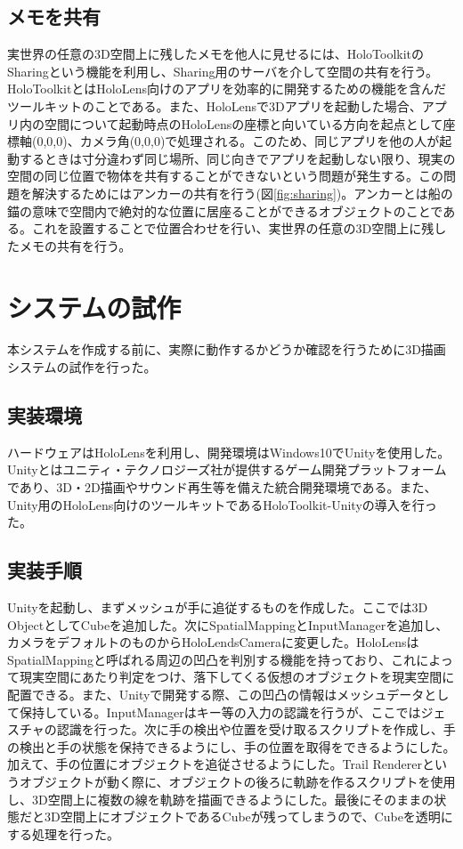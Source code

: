 \documentclass{hissymp}
\begin{document}
\subsection{メモを共有}
実世界の任意の3D空間上に残したメモを他人に見せるには、HoloToolkit\cite{tex7}のSharing\cite{tex8}という機能を利用し、Sharing用のサーバを介して空間の共有を行う。HoloToolkitとはHoloLens向けのアプリを効率的に開発するための機能を含んだツールキットのことである。また、HoloLensで3Dアプリを起動した場合、アプリ内の空間について起動時点のHoloLensの座標と向いている方向を起点として座標軸(0,0,0)、カメラ角(0,0,0)で処理される。このため、同じアプリを他の人が起動するときは寸分違わず同じ場所、同じ向きでアプリを起動しない限り、現実の空間の同じ位置で物体を共有することができないという問題が発生する。この問題を解決するためにはアンカーの共有を行う(図\ref{fig:sharing})。アンカーとは船の錨の意味で空間内で絶対的な位置に居座ることができるオブジェクトのことである。これを設置することで位置合わせを行い、実世界の任意の3D空間上に残したメモの共有を行う。

\section{システムの試作}
本システムを作成する前に、実際に動作するかどうか確認を行うために3D描画システムの試作を行った。

\subsection{実装環境}
ハードウェアはHoloLensを利用し、開発環境はWindows10でUnity\cite{tex9}を使用した。Unityとはユニティ・テクノロジーズ社が提供するゲーム開発プラットフォームであり、3D・2D描画やサウンド再生等を備えた統合開発環境である。また、Unity用のHoloLens向けのツールキットであるHoloToolkit-Unityの導入を行った。

\subsection{実装手順}
Unityを起動し、まずメッシュが手に追従するものを作成した。ここでは3D ObjectとしてCubeを追加した。次にSpatialMappingとInputManagerを追加し、カメラをデフォルトのものからHoloLendsCameraに変更した。HoloLensはSpatialMappingと呼ばれる周辺の凹凸を判別する機能を持っており、これによって現実空間にあたり判定をつけ、落下してくる仮想のオブジェクトを現実空間に配置できる。また、Unityで開発する際、この凹凸の情報はメッシュデータとして保持している。InputManagerはキー等の入力の認識を行うが、ここではジェスチャの認識を行った。次に手の検出や位置を受け取るスクリプトを作成し、手の検出と手の状態を保持できるようにし、手の位置を取得をできるようにした。加えて、手の位置にオブジェクトを追従させるようにした。Trail Renderer\cite{tex10}というオブジェクトが動く際に、オブジェクトの後ろに軌跡を作るスクリプトを使用し、3D空間上に複数の線を軌跡を描画できるようにした。最後にそのままの状態だと3D空間上にオブジェクトであるCubeが残ってしまうので、Cubeを透明にする処理を行った。
\end{document}

